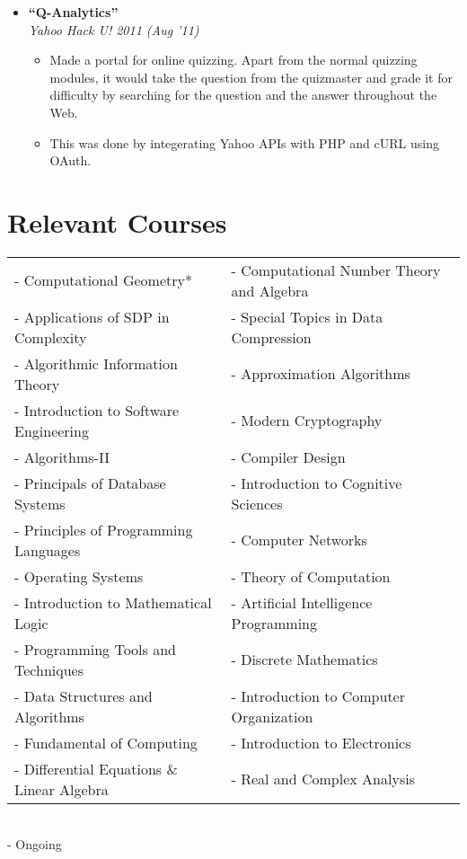 \documentclass[margin,line]{resume}
\begin{document}
\begin{resume}
\begin{itemize}
  \item \large{\textbf{\textsf{``Q-Analytics''}}}
    \\ \small{\textit{Yahoo Hack U! 2011 (Aug '11)}}
    \normalsize
    \begin{itemize}
    \item Made a portal for online quizzing. Apart from the normal quizzing modules, it would take the question from the quizmaster and grade it for difficulty by searching for the question and the answer throughout the Web.
    \item This was done by integerating Yahoo APIs with PHP and cURL using OAuth.
    \end{itemize}
    
  \end{itemize}


  \section{\mysidestyle Relevant Courses}

  \begin{tabular}{ll}
    - Computational Geometry* & - Computational Number Theory and Algebra \\
    - Applications of SDP in Complexity & - Special Topics in Data Compression\\
    - Algorithmic Information Theory & - Approximation Algorithms\\
    - Introduction to Software Engineering & - Modern Cryptography \\
    - Algorithms-II &- Compiler Design \\
    - Principals of Database Systems &- Introduction to Cognitive Sciences \\
    - Principles of Programming Languages &- Computer Networks \\
    - Operating Systems &- Theory of Computation \\
    - Introduction to Mathematical Logic &- Artificial Intelligence Programming \\
    - Programming Tools and Techniques &- Discrete Mathematics \\
    - Data Structures and Algorithms & - Introduction to Computer Organization \\
    - Fundamental of Computing & - Introduction to Electronics\\
    - Differential Equations \& Linear Algebra & - Real and Complex Analysis\\
  \end{tabular}\\
  {\small * - Ongoing}



\end{resume}
\end{document}
